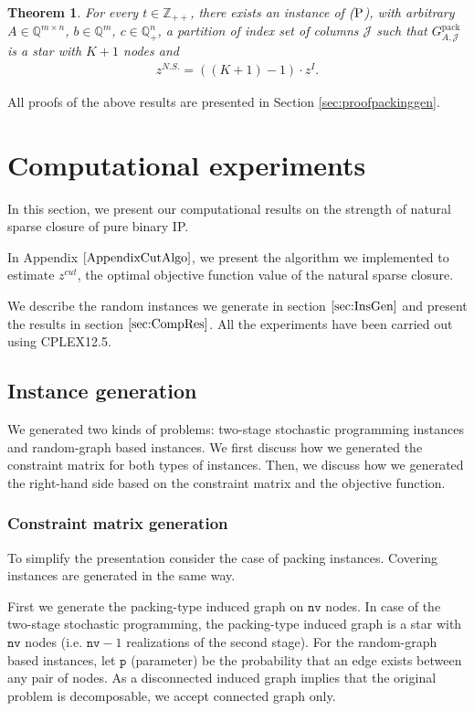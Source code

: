 \documentclass[smallextended]{svjour3}
\newtheorem{theorem}[proposition]{Theorem}
\begin{document}
\begin{theorem}\label{thm:arbitANStight}
For every $t \in \mathbb{Z}_{++}$, there exists an instance of ($\textup{P}$), with arbitrary $A \in \mathbb{Q}^{m \times n}$, $b \in \mathbb{Q}^m$, $c\in \mathbb{Q}^n_{+}$, a partition of index set of columns $\mathcal{J}$ such that  ${G^{\textrm{pack}}_{A, {\mathcal{J}}}}$ is a star with $ K + 1$ nodes and
\begin{eqnarray*}
z^{N.S.} = ((K+1) - 1) \cdot z^I.
\end{eqnarray*}
\end{theorem}

All proofs of the above results are presented in Section \ref{sec:proofpackinggen}.

\section{Computational experiments}\label{sec:computational}

In this section, we present our computational results on the strength of natural sparse closure of pure binary IP. 

In Appendix $\ref{AppendixCutAlgo}$, we present the algorithm we implemented to estimate $z^{cut}$, the optimal objective function value of the natural sparse closure.

We describe the random instances we generate in section $\ref{sec:InsGen}$ and present the results in section $\ref{sec:CompRes}$. All the experiments have been carried out using CPLEX12.5.

\subsection{Instance generation}\label{sec:InsGen}
We generated two kinds of problems: two-stage stochastic programming instances and random-graph based instances. We first discuss how we generated the constraint matrix for both types of instances. Then, we discuss how we generated the right-hand side based on the constraint matrix and the objective function.

\subsubsection{Constraint matrix generation}

To simplify the presentation consider the case of packing instances. Covering instances are generated in the same way. 

First we generate the packing-type induced graph on $\texttt{nv}$ nodes. In case of the two-stage stochastic programming, the packing-type induced graph is a star with $\texttt{nv}$ nodes (i.e. $\texttt{nv} - 1$ realizations of the second stage). For the random-graph based instances, let $\texttt{p}$ (parameter) be the probability that an edge exists between any pair of nodes. As a disconnected induced graph implies that the original problem is decomposable, we accept connected graph only.
\end{document}
